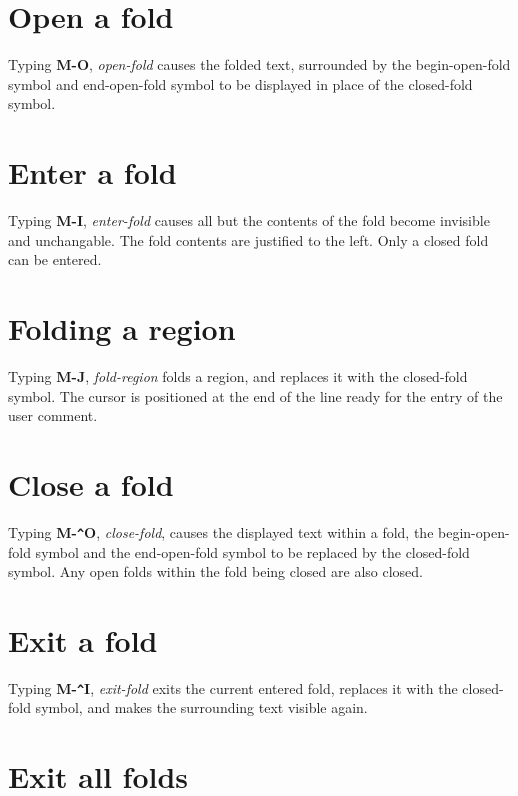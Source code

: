 \section{Open a fold}

Typing {\bf M-O}, {\it open-fold} causes the
folded text, surrounded by the begin-open-fold symbol and end-open-fold
symbol to be displayed in place of the closed-fold symbol.

\section{Enter a fold} 

Typing {\bf M-I}, {\it enter-fold} causes all
but the contents of the fold become invisible and unchangable. The fold
contents are justified to the left. Only a closed fold can be entered.

\section{Folding a region}

Typing {\bf M-J}, {\it fold-region} folds a region, and replaces it
with the closed-fold symbol. The cursor is positioned at the end of the
line ready for the entry of the user comment.

\section{Close a fold}

Typing {\bf M-\verb+^+O}, {\it close-fold}, causes the displayed text
within a fold, the begin-open-fold symbol and the end-open-fold symbol
to be replaced by the closed-fold symbol. Any open folds within the
fold being closed are also closed.

\section{Exit a fold} 

Typing {\bf M-\verb+^+I}, {\it exit-fold} exits the current entered
fold, replaces it with the closed-fold symbol, and makes the
surrounding text visible again.

\section{Exit all folds}

